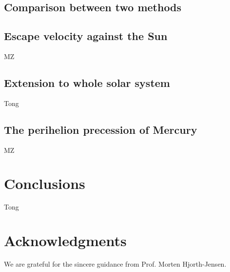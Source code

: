 \documentclass{article}
\begin{document}
	\subsection{Comparison between two methods}
	

	\subsection{Escape velocity against the Sun}
	MZ
	
	\subsection{Extension to whole solar system}
	Tong
	
	\subsection{The perihelion precession of Mercury}
	MZ
	
\section{Conclusions}\label{conclude}
Tong
	
	\section*{Acknowledgments}
	We are grateful for the sincere guidance from Prof. Morten Hjorth-Jensen. 
	
	\nocite{*} 
	
	
\end{document}
